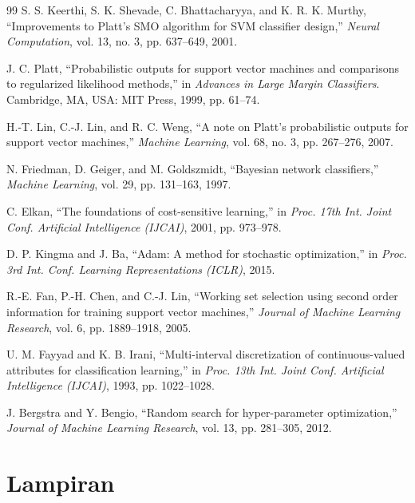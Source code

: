 \begin{thebibliography}{99}
S. S. Keerthi, S. K. Shevade, C. Bhattacharyya, and K. R. K. Murthy, ``Improvements to Platt's SMO algorithm for SVM classifier design,'' \emph{Neural Computation}, vol. 13, no. 3, pp. 637--649, 2001.

J. C. Platt, ``Probabilistic outputs for support vector machines and comparisons to regularized likelihood methods,'' in \emph{Advances in Large Margin Classifiers}. Cambridge, MA, USA: MIT Press, 1999, pp. 61--74.

H.-T. Lin, C.-J. Lin, and R. C. Weng, ``A note on Platt's probabilistic outputs for support vector machines,'' \emph{Machine Learning}, vol. 68, no. 3, pp. 267--276, 2007.

N. Friedman, D. Geiger, and M. Goldszmidt, ``Bayesian network classifiers,'' \emph{Machine Learning}, vol. 29, pp. 131--163, 1997.

C. Elkan, ``The foundations of cost-sensitive learning,'' in \emph{Proc. 17th Int. Joint Conf. Artificial Intelligence (IJCAI)}, 2001, pp. 973--978.

D. P. Kingma and J. Ba, ``Adam: A method for stochastic optimization,'' in \emph{Proc. 3rd Int. Conf. Learning Representations (ICLR)}, 2015.

R.-E. Fan, P.-H. Chen, and C.-J. Lin, ``Working set selection using second order information for training support vector machines,'' \emph{Journal of Machine Learning Research}, vol. 6, pp. 1889--1918, 2005.

U. M. Fayyad and K. B. Irani, ``Multi-interval discretization of continuous-valued attributes for classification learning,'' in \emph{Proc. 13th Int. Joint Conf. Artificial Intelligence (IJCAI)}, 1993, pp. 1022--1028.

J. Bergstra and Y. Bengio, ``Random search for hyper-parameter optimization,'' \emph{Journal of Machine Learning Research}, vol. 13, pp. 281--305, 2012.
\end{thebibliography}

\clearpage
\section{Lampiran}
